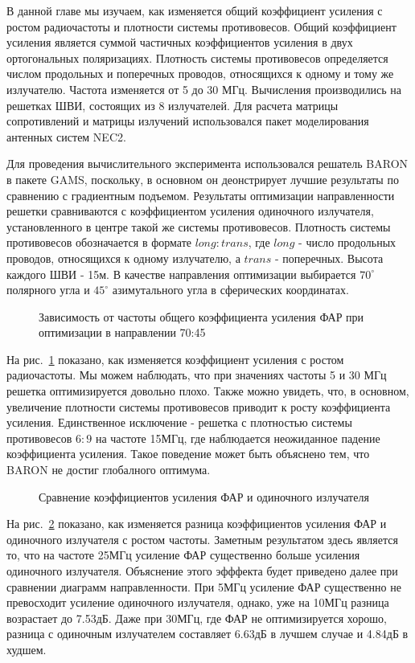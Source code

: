 В данной главе мы изучаем, как изменяется общий коэффициент усиления с ростом радиочастоты и плотности системы противовесов. Общий коэффициент усиления является суммой частичных коэффициентов усиления в  двух ортогональных поляризациях. Плотность системы противовесов определяется числом продольных и поперечных проводов, относящихся к одному и тому же излучателю. Частота изменяется от 5 до 30 МГц. Вычисления производились на решетках ШВИ, состоящих из 8 излучателей. Для расчета матрицы сопротивлений и матрицы излучений использовался пакет моделирования антенных систем NEC2.

Для проведения вычислительного эксперимента использовался решатель BARON в пакете GAMS, поскольку, в основном он деонстрирует лучшие результаты по сравнению с градиентным подъемом. Результаты оптимизации направленности решетки сравниваются с коэффициентом усиления одиночного излучателя, установленного в центре такой же системы противовесов. Плотность системы противовесов обозначается в формате $long:trans$, где $long$ - число продольных проводов, относящихся к одному излучателю, а $trans$ - поперечных. Высота каждого ШВИ - 15м. В качестве направления оптимизации выбирается $70^{\circ}$ полярного угла и $45^{\circ}$ азимутального угла в сферических координатах.

\begin{figure}
\caption{Зависимость от частоты общего коэффициента усиления ФАР при оптимизации в направлении 70:45}
\label{ris:paa_gains}
\end{figure}

На рис.~\ref{ris:paa_gains} показано, как изменяется коэффициент усиления с ростом радиочастоты. Мы можем наблюдать, что при значениях частоты 5 и 30 МГц решетка оптимизируется довольно плохо. Также можно увидеть, что, в основном, увеличение плотности системы противовесов приводит к росту коэффициента усиления. Единственное исключение - решетка с плотностью системы противовесов $6:9$ на частоте 15МГц, где наблюдается неожиданное падение коэффициента усиления. Такое поведение может быть объяснено тем, что BARON не достиг глобалного оптимума.

\begin{figure}
\caption{Сравнение коэффициентов усиления ФАР и одиночного излучателя}
\label{ris:all_gains}
\end{figure}

На рис.~\ref{ris:all_gains} показано, как изменяется разница коэффициентов усиления ФАР и одиночного излучателя с ростом частоты. Заметным результатом здесь является то, что на частоте 25МГц усиление ФАР существенно больше усиления одиночного излучателя. Объяснение этого эфффекта будет приведено далее при сравнении диаграмм направленности. При 5МГц усиление ФАР существенно не превосходит усиление одиночного излучателя, однако, уже на 10МГц разница возрастает до 7.53дБ. Даже при 30МГц, где ФАР не оптимизируется хорошо, разница с одиночным излучателем составляет 6.63дБ в лучшем случае и 4.84дБ в худшем.

